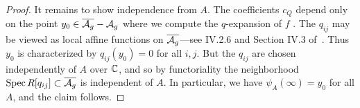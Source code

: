 \documentclass{amsart}
\begin{document}
\begin{proof}
  It remains to show independence from $A$. The coefficients $c_Q$ depend only on the point $y_0 \in \overline{\mathcal{A}_g} - \mathcal{A}_g$ where we compute the $q$-expansion of $f$%
. The $q_{ij}$ may be viewed as local affine functions on $\overline{\mathcal{A}_g}$---see IV.2.6 and Section IV.3 of~\cite{faltings1990degeneration}. Thus $y_0$ is characterized by $q_{ij}(y_0) = 0$ for all $i,j$. But the $q_{ij}$ are chosen independently of $A$ over $\mathbb{C}$, and so by functoriality the neighborhood $\operatorname{Spec} R[q_{ij}] \subset \overline{\mathcal{A}_g}$ is independent of $A$. In particular, we have $\psi_A(\infty) = y_0$ for all $A$, and the claim follows. %
\end{proof}
\end{document}
